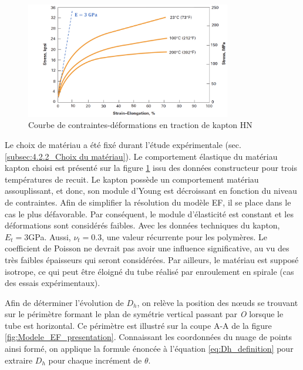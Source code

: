 \begin{figure}[!htbp]
\begin{center}
    \captionsetup{justification=centering}
	\includegraphics[trim={2cm 0cm 0cm 0cm},clip,width=0.8\textwidth]{../Chap5/Figure/Dupont_kapton.pdf}
	\caption{Courbe de contraintes-déformations en traction de kapton HN \cite{Dupont2012}}
	\label{fig:Dupont_kapton}
\end{center}	
\end{figure} 
Le choix de matériau a été fixé durant l'étude expérimentale (sec. \ref{subsec:4.2.2_Choix du matériau}). Le comportement élastique du matériau kapton choisi est présenté sur la figure \ref{fig:Dupont_kapton} issu des données constructeur pour trois températures de recuit. Le kapton possède un comportement matériau assouplissant, et donc, son module d'Young est décroissant en fonction du niveau de contraintes. Afin de simplifier la résolution du modèle EF, il se place dans le cas le plus défavorable. Par conséquent, le module d'élasticité est constant et les déformations sont considérés faibles. Avec les données techniques du kapton, $E_t = 3$GPa. Aussi, $\nu_t = 0.3$, une valeur récurrente pour les polymères. Le coefficient de Poisson ne devrait pas avoir une influence significative, au vu des très faibles épaisseurs qui seront considérées. Par ailleurs, le matériau est supposé isotrope, ce qui peut être éloigné du tube réalisé par enroulement en spirale (cas des essais expérimentaux).

Afin de déterminer l'évolution de $D_h$, on relève la position des n\oe{}uds se trouvant sur le périmètre formant le plan de symétrie vertical passant par \emph{O} lorsque le tube est horizontal. Ce périmètre est illustré sur la coupe A-A de la figure \ref{fig:Modele_EF_presentation}. Connaissant les coordonnées du nuage de points ainsi formé, on applique la formule énoncée à l'équation \ref{eq:Dh_definition} pour extraire $D_h$ pour chaque incrément de $\theta$.

